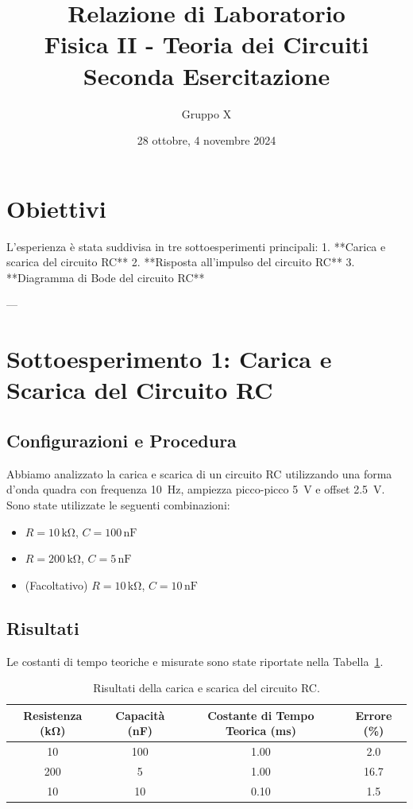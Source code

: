 \documentclass[a4paper,11pt]{article}
\title{Relazione di Laboratorio\\Fisica II - Teoria dei Circuiti\\Seconda Esercitazione}
\author{Gruppo X}
\date{28 ottobre, 4 novembre 2024}
\begin{document}
\maketitle

\section*{Obiettivi}
L'esperienza è stata suddivisa in tre sottoesperimenti principali:  
1. **Carica e scarica del circuito RC**  
2. **Risposta all'impulso del circuito RC**  
3. **Diagramma di Bode del circuito RC**

---

\section{Sottoesperimento 1: Carica e Scarica del Circuito RC}
\subsection*{Configurazioni e Procedura}
Abbiamo analizzato la carica e scarica di un circuito RC utilizzando una forma d'onda quadra con frequenza \SI{10}{\hertz}, ampiezza picco-picco \SI{5}{\volt} e offset \SI{2.5}{\volt}. Sono state utilizzate le seguenti combinazioni:
\begin{itemize}
    \item \( R = 10 \, \mathrm{k\Omega} \), \( C = 100 \, \mathrm{nF} \)
    \item \( R = 200 \, \mathrm{k\Omega} \), \( C = 5 \, \mathrm{nF} \)
    \item (Facoltativo) \( R = 10 \, \mathrm{k\Omega} \), \( C = 10 \, \mathrm{nF} \)
\end{itemize}

\subsection*{Risultati}
Le costanti di tempo teoriche e misurate sono state riportate nella Tabella~\ref{tab:rc_charge_discharge}.
\begin{table}[H]
\centering
\begin{tabular}{|c|c|c|c|}
\hline
\textbf{Resistenza (\si{\kilo\ohm})} & \textbf{Capacità (\si{\nano\farad})} & \textbf{Costante di Tempo Teorica (\si{\milli\second})} & \textbf{Errore (\%)} \\ \hline
10 & 100 & 1.00 & 2.0 \\ \hline
200 & 5 & 1.00 & 16.7 \\ \hline
10 & 10 & 0.10 & 1.5 \\ \hline
\end{tabular}
\caption{Risultati della carica e scarica del circuito RC.}
\label{tab:rc_charge_discharge}
\end{table}
\end{document}
